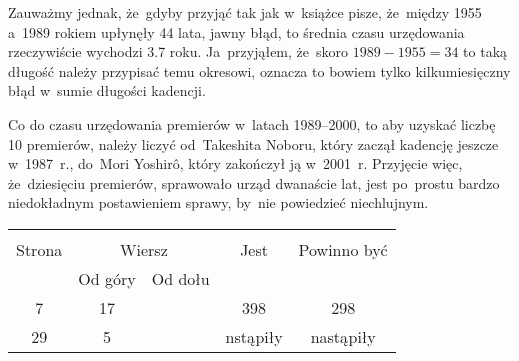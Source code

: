 \documentclass[a4paper,11pt]{article}
\begin{document}
Zauważmy jednak, że~gdyby przyjąć tak jak w~książce pisze, że~między
1955 a~1989 rokiem upłynęły 44 lata, jawny błąd, to średnia czasu
urzędowania rzeczywiście wychodzi 3.7 roku. Ja~przyjąłem, że~skoro
$1989 - 1955 = 34$ to taką długość należy przypisać temu okresowi,
oznacza to bowiem tylko kilkumiesięczny błąd w~sumie długości
kadencji.

Co do czasu urzędowania premierów w~latach 1989--2000, to aby uzyskać
liczbę 10 premierów, należy liczyć od~Takeshita Noboru, który zaczął
kadencję jeszcze w~1987~r., do~Mori Yoshir\^{o}, który zakończył ją
w~2001~r. Przyjęcie więc, że~dziesięciu premierów, sprawowało urząd
dwanaście lat, jest po~prostu bardzo niedokładnym postawieniem sprawy,
by~nie powiedzieć niechlujnym.

\begin{center}
  \begin{tabular}{|c|c|c|c|c|}
    \hline
    & \multicolumn{2}{c|}{} & & \\
    Strona & \multicolumn{2}{c|}{Wiersz} & Jest
                              & Powinno być \\ \cline{2-3}
    & Od góry & Od dołu & & \\
    \hline
    7   & 17 & & 398 & 298 \\
    29  &  5 & & nstąpiły & nastąpiły \\
    \hline
  \end{tabular}


\end{center}
\end{document}
